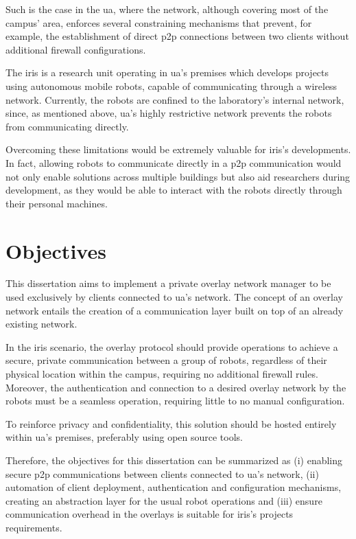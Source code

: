 \documentclass[11pt,twoside,a4paper]{report}
\begin{document}
Such is the case in the \ac{ua}, where the network, although covering most of the campus' area, enforces several constraining mechanisms that prevent, for example, the establishment of direct \ac{p2p} connections between two clients without additional firewall configurations.

The \ac{iris} is a research unit operating in \ac{ua}'s premises which develops projects using autonomous mobile robots, capable of communicating through a wireless network. Currently, the robots are confined to the laboratory's internal network, since, as mentioned above, \ac{ua}'s highly restrictive network prevents the robots from communicating directly.

Overcoming these limitations would be extremely valuable for \ac{iris}'s developments. In fact, allowing robots to communicate directly in a \ac{p2p} communication would not only enable solutions across multiple buildings but also aid researchers during development, as they would be able to interact with the robots directly through their personal machines.

\section{Objectives}
\label{sec:obj}

This dissertation aims to implement a private overlay network manager to be used exclusively by clients connected to \ac{ua}'s network. The concept of an overlay network entails the creation of a communication layer built on top of an already existing network.

In the \ac{iris} scenario, the overlay protocol should provide operations to achieve a secure, private communication between a group of robots, regardless of their physical location within the campus, requiring no additional firewall rules. Moreover, the authentication and connection to a desired overlay network by the robots must be a seamless operation, requiring little to no manual configuration.

To reinforce privacy and confidentiality, this solution should be hosted entirely within \ac{ua}'s premises, preferably using open source tools.

Therefore, the objectives for this dissertation can be summarized as (i) enabling secure \ac{p2p} communications between clients connected to \ac{ua}'s network, (ii) automation of client deployment, authentication and configuration mechanisms, creating an abstraction layer for the usual robot operations and (iii) ensure communication overhead in the overlays is suitable for \ac{iris}'s projects requirements.
\end{document}
